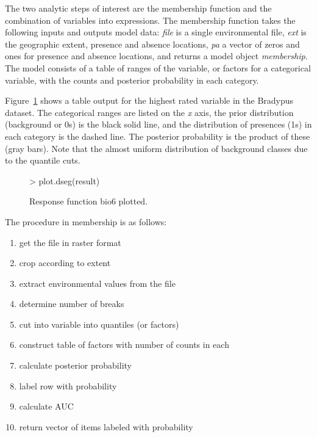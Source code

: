 \documentclass{article}
\begin{document}
The two analytic steps of interest are the membership function and the combination of variables into expressions.  The membership function takes the following inputs and outputs model data: \emph{file} is a single environmental file, \emph{ext} is the geographic extent, presence and absence locations, \emph{pa} a vector of zeros and ones for presence and absence locations, and returns a model object \emph{membership}.  The model consists of a table of ranges of the variable, or factors for a categorical variable, with the counts and posterior probability in each category. 

Figure~\ref{fig2} shows a table output for the highest rated variable in the Bradypus dataset.  The categorical ranges are listed on the \emph{x} axis, the prior distribution (background or 0s) is the black solid line, and the distribution of presences (1s) in each category is the dashed line.  The posterior probability is the product of these (gray bars).  Note that the almost uniform distribution of background classes due to the quantile cuts.

\begin{figure}[htbp]
\begin{center}
\begin{Schunk}
\begin{Sinput}
> plot.dseg(result)
\end{Sinput}
\end{Schunk}
\caption{\label{fig2} Response function bio6 plotted.}
\end{center}
\end{figure}

The procedure in membership is as follows:

\begin{enumerate}
  \item get the file in raster format
  \item crop according to extent
  \item extract environmental values from the file
  \item determine number of breaks
  \item cut into variable into quantiles (or factors)
  \item construct table of factors with number of counts in each
  \item calculate posterior probability
  \item label row with probability 
  \item calculate AUC
  \item return vector of items labeled with probability
\end{enumerate}
\end{document}
